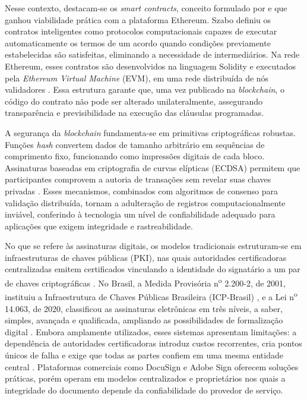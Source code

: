 \documentclass[
    12pt,
    a4paper,
    oneside,
    chapter=TITLE,
    section=TITLE,
    subsection=TITLE,
    subsubsection=TITLE,
    sumario=tradicional,
    english,
    brazil
]{abntex2}
\begin{document}
Nesse contexto, destacam-se os \emph{smart contracts}, conceito
formulado por  e que ganhou viabilidade prática
com a plataforma Ethereum. Szabo definiu os contratos inteligentes
como protocolos computacionais capazes de executar automaticamente
os termos de um acordo quando condições previamente estabelecidas
são satisfeitas, eliminando a necessidade de intermediários. Na rede
Ethereum, esses contratos são desenvolvidos na linguagem Solidity e
executados pela \emph{Ethereum Virtual
Machine} (EVM), em uma rede distribuída de nós validadores
\cite{buterin2014}. Essa estrutura garante que, uma vez publicado na
\emph{blockchain}, o código do contrato não pode ser alterado
unilateralmente, assegurando transparência e previsibilidade na
execução das cláusulas programadas.

A segurança da \emph{blockchain} fundamenta-se em primitivas
criptográficas robustas. Funções \emph{hash} convertem dados de
tamanho arbitrário em sequências de comprimento fixo, funcionando
como impressões digitais de cada bloco. Assinaturas baseadas em
criptografia de curvas elípticas (ECDSA) permitem que participantes
comprovem a autoria de transações sem revelar suas chaves privadas
\cite{stallings2017}. Esses mecanismos, combinados com algoritmos de
consenso para validação distribuída, tornam a adulteração de
registros computacionalmente inviável, conferindo à tecnologia um
nível de confiabilidade adequado para aplicações que exigem
integridade e rastreabilidade.

No que se refere às assinaturas digitais, os modelos tradicionais
estruturam-se em infraestruturas de chaves públicas (PKI), nas quais
autoridades certificadoras centralizadas emitem certificados
vinculando a identidade do signatário a um par de chaves
criptográficas \cite{stallings2017}. No Brasil, a Medida Provisória
n\textsuperscript{o} 2.200-2, de 2001, instituiu a Infraestrutura de
Chaves Públicas Brasileira (ICP-Brasil) \cite{brasil2001}, e a Lei
n\textsuperscript{o} 14.063, de 2020, classificou as assinaturas eletrônicas em três
níveis, a saber, simples, avançada e qualificada, ampliando as
possibilidades de formalização digital \cite{brasil2020}. Embora amplamente utilizados,
esses sistemas apresentam limitações: a dependência de autoridades
certificadoras introduz custos recorrentes, cria pontos únicos de
falha e exige que todas as partes confiem em uma mesma entidade
central \cite{alharby2017}. Plataformas comerciais como DocuSign e
Adobe Sign oferecem soluções práticas, porém operam em modelos
centralizados e proprietários nos quais a integridade do documento
depende da confiabilidade do provedor de serviço.
\end{document}
